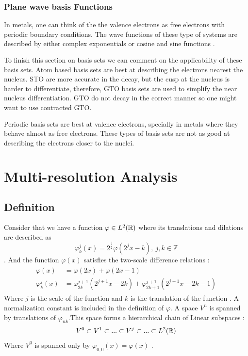 \documentclass[../master_thesis.tex]{subfiles}
\begin{document}
\subsubsection{Plane wave basis Functions}
In metals, one can think of the the valence electrons as free electrons with
periodic boundary conditions. The wave functions of these type of systems are
described by either complex exponentials or cosine and sine functions \cite{Jensen:2017}.

To finish this section on basis sets we can comment on the applicability of these
basis sets. Atom based basis sets are best at describing the electrons nearest the
nucleus. \ac{STO} are more accurate in the decay, but the cusp at the nucleus is
harder to differentiate, therefore, \ac{GTO} basis sets are used to simplify the
near nucleus differentiation. \ac{GTO} do not decay in the correct manner so one
might want to use contracted \ac{GTO}.

Periodic basis sets are best at valence electrons, specially in metals where they
behave almost as free electrons. These types of basis sets are not as good at describing
the electrons closer to the nuclei.

\section{Multi-resolution Analysis}
\subsection{Definition}
Consider that we have a function $\varphi \in L^2(\mathbb{R})$ where its translations
and dilations are described as \cite{Schneider:2007}
\begin{equation}
  \varphi^j_k(x) = 2^{\frac{j}{2}}\varphi(2^jx - k),\  j,k \in \mathbb{Z}
\end{equation}.
And the function $\varphi(x)$ satisfies the two-scale difference relations \cite{Beylkin:MRA, Schneider:2007, Sorland}:
\begin{align}
  \begin{split}
    \varphi(x) &= \varphi(2x) + \varphi(2x - 1)\\
    \varphi^j_k(x) &= \varphi^{j+1}_{2k}(2^{j+1}x - 2k) + \varphi^{j+1}_{2k+1}(2^{j+1}x - 2k - 1)
  \end{split}
\end{align}
Where $j$ is the scale of the function and $k$ is the translation of the function
\cite{Sorland}. A normalization constant is included in the definition of $\varphi$.
A space $V^n$ is spanned by translations of $\varphi_{nk}$.This space forms a
hierarchical chain of Linear
subspaces \cite{Beylkin:MRA}:
\begin{equation}
  V^0 \subset V^1 \subset ... \subset V^j \subset ... \subset L^2(\mathbb{R})\label{eq:seqsubspace}
\end{equation}
Where $V^0$ is spanned only by $\varphi_{0,0}(x)=\varphi(x)$ \cite{Sorland}.
\end{document}
